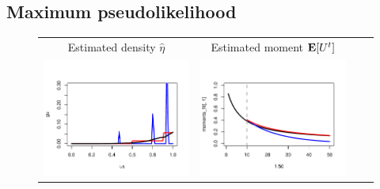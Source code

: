 \documentclass[12pt]{article}
\begin{document}
\subsection{Maximum pseudolikelihood}

\begin{figure}
\centering
\begin{tabular}{ccrl}
Estimated density $\hat{\eta}$ &Estimated moment $\textbf{E}[U^t]$ & \\
\multirow{5}{*}{\includegraphics[scale = 0.5, clip=true, trim=0.2in 0.6in 0 0.7in]{../extrapolation/gu_est.pdf}} &
\multirow{5}{*}{\includegraphics[scale = 0.5, clip=true, trim=0.2in 0.6in 0 0.7in]{../extrapolation/gu_est_moments.pdf}} & & \\

\end{tabular}
\end{figure}
\end{document}
